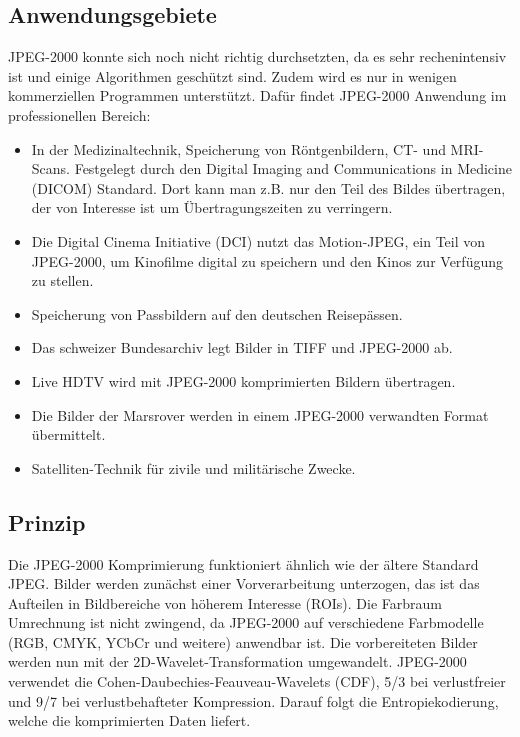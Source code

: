 \subsection{Anwendungsgebiete
\label{jpeg:subsection:anwendungsgebiete}}
JPEG-2000 konnte sich noch nicht richtig durchsetzten, da es sehr rechenintensiv ist und einige Algorithmen geschützt sind.
Zudem wird es nur in wenigen kommerziellen Programmen unterstützt.
Dafür findet JPEG-2000 Anwendung im professionellen Bereich:
\begin{itemize}
    \item In der Medizinaltechnik, Speicherung von Röntgenbildern, CT- und MRI-Scans.
    Festgelegt durch den Digital Imaging and Communications in Medicine (DICOM) Standard.
    Dort kann man z.B. nur den Teil des Bildes übertragen, der von Interesse ist um Übertragungszeiten zu verringern.
    \item Die Digital Cinema Initiative (DCI) nutzt das Motion-JPEG, ein Teil von JPEG-2000, um Kinofilme digital zu speichern und den Kinos zur Verfügung zu stellen.
    \item Speicherung von Passbildern auf den deutschen Reisepässen.
    \item Das schweizer Bundesarchiv legt Bilder in TIFF und JPEG-2000 ab.
    \item Live HDTV wird mit JPEG-2000 komprimierten Bildern übertragen.
    \item Die Bilder der Marsrover werden in einem JPEG-2000 verwandten Format übermittelt.
    \item Satelliten-Technik für zivile und militärische Zwecke.   
\end{itemize}


\subsection{Prinzip
\label{jpeg:subsection:prinzip}}
Die JPEG-2000 Komprimierung funktioniert ähnlich wie der ältere Standard JPEG.
Bilder werden zunächst einer Vorverarbeitung unterzogen, das ist das Aufteilen in Bildbereiche von höherem Interesse (ROIs).
Die Farbraum Umrechnung ist nicht zwingend, da JPEG-2000 auf verschiedene Farbmodelle (RGB, CMYK, YCbCr und weitere) anwendbar ist.
Die vorbereiteten Bilder werden nun mit der 2D-Wavelet-Transformation umgewandelt.
JPEG-2000 verwendet die Cohen-Daubechies-Feauveau-Wavelets (CDF), 5/3 bei verlustfreier und 9/7 bei verlustbehafteter Kompression.
Darauf folgt die Entropiekodierung, welche die komprimierten Daten liefert. 


